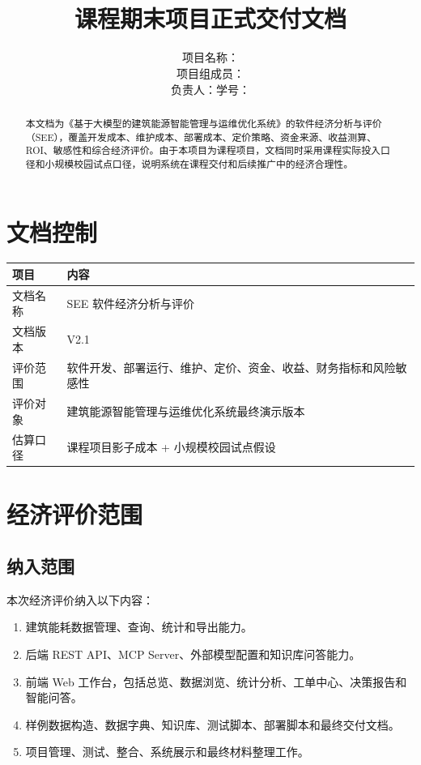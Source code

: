 \documentclass[12pt,a4paper]{ctexart}
\title{
    \vspace{-2em}
    \heiti \zihao{2} \reporttitle \\
    \vspace{1em}
    \zihao{4} 课程期末项目正式交付文档
}
\author{
    \songti \zihao{4}
    项目名称：\projectname \\
    项目组成员：\teamname \\
    负责人：\studentname \quad 学号：\studentid
}
\date{\docdate}
\newcommand{\projectname}{基于大模型的建筑能源智能管理与运维优化系统}
\newcommand{\docversion}{V2.1}
\begin{document}
\maketitle
\thispagestyle{fancy}

\begin{abstract}
本文档为《\projectname》的软件经济分析与评价（SEE），覆盖开发成本、维护成本、部署成本、定价策略、资金来源、收益测算、ROI、敏感性和综合经济评价。由于本项目为课程项目，文档同时采用课程实际投入口径和小规模校园试点口径，说明系统在课程交付和后续推广中的经济合理性。
\end{abstract}

\tableofcontents
\newpage

\section{文档控制}
\begin{longtable}{p{4cm}p{10.5cm}}
\toprule
项目 & 内容 \\
\midrule
文档名称 & SEE 软件经济分析与评价 \\
文档版本 & \docversion \\
评价范围 & 软件开发、部署运行、维护、定价、资金、收益、财务指标和风险敏感性 \\
评价对象 & 建筑能源智能管理与运维优化系统最终演示版本 \\
估算口径 & 课程项目影子成本 + 小规模校园试点假设 \\
\bottomrule
\end{longtable}

\section{经济评价范围}
\subsection{纳入范围}
本次经济评价纳入以下内容：
\begin{enumerate}
    \item 建筑能耗数据管理、查询、统计和导出能力。
    \item 后端 REST API、MCP Server、外部模型配置和知识库问答能力。
    \item 前端 Web 工作台，包括总览、数据浏览、统计分析、工单中心、决策报告和智能问答。
    \item 样例数据构造、数据字典、知识库、测试脚本、部署脚本和最终交付文档。
    \item 项目管理、测试、整合、系统展示和最终材料整理工作。
\end{enumerate}
\end{document}
